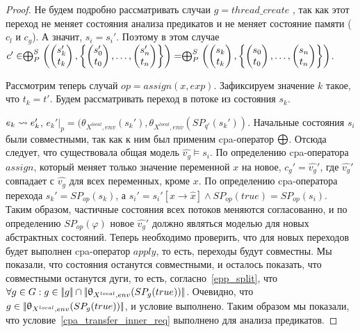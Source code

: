 \begin{proof}
Не будем подробно рассматривать случаи $g = thread\_create$
, так как этот переход не меняет состояния анализа предикатов и не меняет состояние памяти ($c_l$ и $c_g$).
А значит, $s_i = s_i'$.
Поэтому в этом случае $c' \in \mathrel{\bigoplus}^S_P
\left(
\begin{pmatrix}
s_k' \\
t_k 
\end{pmatrix},
\left\{
\begin{pmatrix}
s_0' \\
t_0 
\end{pmatrix},
\dots ,
\begin{pmatrix}
s_n' \\
t_n 
\end{pmatrix}
\right\}
\right) = 
\mathrel{\bigoplus}^S_P
\left(
\begin{pmatrix}
s_k \\
t_k 
\end{pmatrix},
\left\{
\begin{pmatrix}
s_0 \\
t_0 
\end{pmatrix},
\dots ,
\begin{pmatrix}
s_n \\
t_n 
\end{pmatrix}
\right\}
\right)$.

Рассмотрим теперь случай $op = assign(x, exp)$. Зафиксируем значение $k$ такое, что $t_k = t'$. Будем рассматривать переход в потоке из состояния $s_k$.

$e_k \leadsto e_k'$, $e_k'|_p = (\theta_{X^{local},env}(s_k'),\theta_{X^{local},env}(SP_{q'}(s_k'))$. 
Начальные состояния $s_i$ были совместными, так как к ним был применим cpa-оператор $\mathrel{\bigoplus}$. 
Отсюда следует, что существовала общая модель $\hat{v_g} \models s_i$.
По определению cpa-оператора $assign$, который меняет только значение переменной $x$ на новое, $c_g' = \hat{v_g}'$, где $\hat{v_g}'$ совпадает с $\hat{v_g}$ для всех переменных, кроме $x$.
По определению cpa-оператора перехода $s_k' = SP_{op}(s_k)$, а $s_i' = s_i'[x \rightarrow \hat x] \land SP_{op}(true) = SP_{op}(s_i)$.
Таким образом, частичные состояния всех потоков меняются согласованно, и по определению $SP_{op}(\varphi)$ новое $\hat{v_g}'$ должно являться моделью для новых абстрактных состояний.
Теперь необходимо проверить, что для новых переходов будет выполнен cpa-оператор $apply$, то есть, переходы будут совместны.
Мы показали, что состояния останутся совместными, и осталось показать, что совместными останутся дуги, то есть, согласно~\ref{epp_split}, что $\forall g \in G: g \in \lvert \! \lvert g \rvert \! \rvert \cap \lvert \! \lvert \uptheta_{X^{local},env}(SP_{g}(true)) \rvert \! \rvert$. 
Очевидно, что $g \in \lvert \! \lvert \uptheta_{X^{local},env}(SP_{g}(true)) \rvert \! \rvert$, и условие выполнено.
Таким образом мы показали, что условие~\ref{cpa_transfer_inner_req} выполнено для анализа предикатов.

\end{proof}


